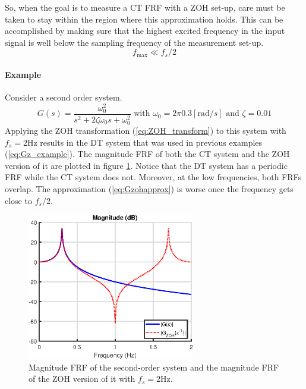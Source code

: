 So, when the goal is to measure a CT FRF with a ZOH set-up, care must be taken to stay within the region where this approximation holds. This can be accomplished by making sure that the highest excited frequency in the input signal is well below the sampling frequency of the measurement set-up.
\begin{equation*}
    f_{\text{max}} \ll f_s/2
\end{equation*}

\paragraph{Example}
Consider a second order system.
\begin{equation*}
    G(s) = \frac{\omega_0^2}{s^2 + 2 \zeta \omega_0 s + \omega_0^2} \text{ with } \omega_0 = 2 \pi 0.3 [\text{rad}/s] \text{ and } \zeta = 0.01
\end{equation*}
Applying the ZOH transformation (\ref{eq:ZOH_transform}) to this system with $f_s = 2 \text{Hz}$ results in the DT system that was used in previous examples (\ref{eq:Gz_example}). The magnitude FRF of both the CT system and the ZOH version of it are plotted in figure \ref{fig:Gzoh_example}. Notice that the DT system has a periodic FRF while the CT system does not. Moreover, at the low frequencies, both FRFs overlap. The approximation (\ref{eq:Gzohapprox}) is worse once the frequency gets close to $f_s/2$.

\begin{figure}[H]
    \centering
    \includegraphics[width=0.65\textwidth]{figures/ZOH.eps}
    \caption{Magnitude FRF of the second-order system and the magnitude FRF of the ZOH version of it with $f_s = 2 \text{Hz}$.}
    \label{fig:Gzoh_example}
\end{figure}

